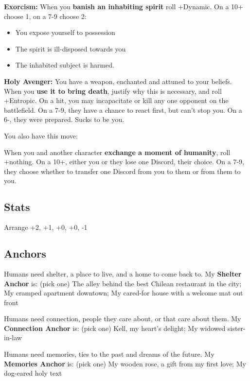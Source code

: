 \documentclass[
  oneside,
  statementpaper,
  9pt]{memoir}
\begin{document}
\textbf{Exorcism:} When you \textbf{banish an inhabiting spirit} roll
+Dynamic. On a 10+ choose 1, on a 7-9 choose 2:

\begin{itemize}
\tightlist
\item
  You expose yourself to possession
\item
  The spirit is ill-disposed towards you
\item
  The inhabited subject is harmed.
\end{itemize}

\textbf{Holy Avenger:} You have a weapon, enchanted and attuned to your
beliefs. When you \textbf{use it to bring death}, justify why this is
necessary, and roll +Entropic. On a hit, you may incapacitate or kill
any one opponent on the battlefield. On a 7-9, they have a chance to
react first, but can't stop you. On a 6-, they were prepared. Sucks to
be you.

You also have this move:

When you and another character \textbf{exchange a moment of humanity},
roll +nothing. On a 10+, either you or they lose one Discord, their
choice. On a 7-9, they choose whether to transfer one Discord from you
to them or from them to you.

\hypertarget{stats-5}{%
\subsection{Stats}\label{stats-5}}

Arrange +2, +1, +0, +0, -1

\hypertarget{anchors-4}{%
\subsection{Anchors}\label{anchors-4}}

Humans need shelter, a place to live, and a home to come back to. My
\textbf{Shelter Anchor} is: (pick one) The alley behind the best Chilean
restaurant in the city; My cramped apartment downtown; My cared-for
house with a welcome mat out front

Humans need connection, people they care about, or that care about them.
My \textbf{Connection Anchor} is: (pick one) Kell, my heart's delight;
My widowed sister-in-law

Humans need memories, ties to the past and dreams of the future. My
\textbf{Memories Anchor} is: (pick one) My wooden rose, a gift from my
first love; My dog-eared holy text
\end{document}
